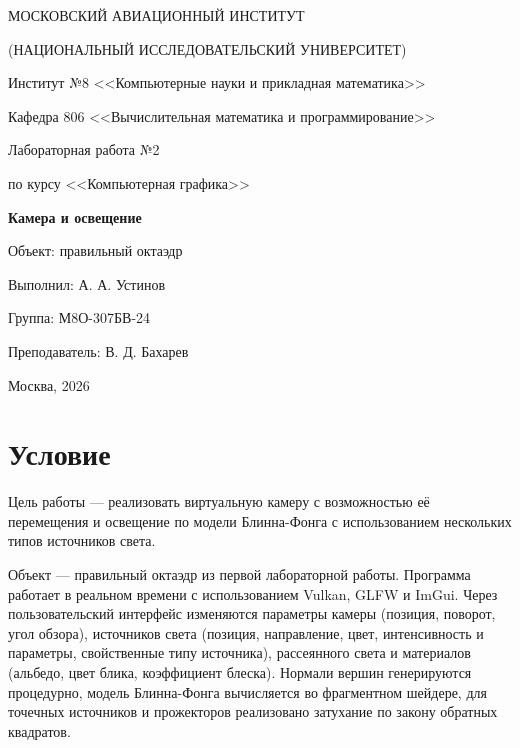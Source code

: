 \documentclass[14pt,a4paper]{extarticle}
\newcommand{\Student}{А. А. Устинов}
\newcommand{\Group}{М8О-307БВ-24}
\newcommand{\Teacher}{В. Д. Бахарев}
\newcommand{\Year}{2026}
\begin{document}
\begin{titlepage}
	\centering

	МОСКОВСКИЙ АВИАЦИОННЫЙ ИНСТИТУТ\par
	(НАЦИОНАЛЬНЫЙ ИССЛЕДОВАТЕЛЬСКИЙ УНИВЕРСИТЕТ)\par

	\vspace{6mm}

	Институт №8 <<Компьютерные науки и прикладная математика>>\par
	Кафедра 806 <<Вычислительная математика и программирование>>\par

	\vspace{6cm}

	{\Large Лабораторная работа №2\par}
	\vspace{3mm}
	{\large по курсу <<Компьютерная графика>>\par}
	\vspace{8mm}
	{\Large\bfseries Камера и освещение\par}
	\vspace{3mm}
	{\large Объект: правильный октаэдр\par}

	\vspace{4cm}

	\begin{flushright}
		\begin{minipage}{0.5\textwidth}
			Выполнил: \Student\par
			Группа: \Group\par
			\vspace{6mm}
			Преподаватель: \Teacher\par
		\end{minipage}
	\end{flushright}

	\vfill
	Москва, \Year\par
\end{titlepage}

\section{Условие}

Цель работы — реализовать виртуальную камеру с возможностью её перемещения и
освещение по модели Блинна-Фонга с использованием нескольких типов источников
света.

Объект — правильный октаэдр из первой лабораторной работы. Программа работает
в реальном времени с использованием Vulkan, GLFW и ImGui. Через
пользовательский интерфейс изменяются параметры камеры (позиция, поворот, угол
обзора), источников света (позиция, направление, цвет, интенсивность и
параметры, свойственные типу источника), рассеянного света и материалов
(альбедо, цвет блика, коэффициент блеска). Нормали вершин генерируются
процедурно, модель Блинна-Фонга вычисляется во фрагментном шейдере, для
точечных источников и прожекторов реализовано затухание по закону обратных
квадратов.
\end{document}

